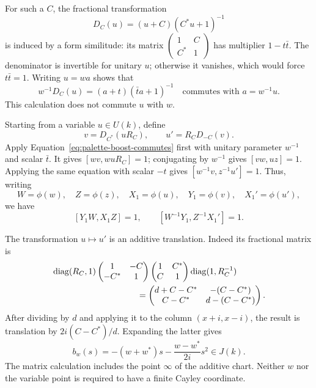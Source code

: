 For such a $C$, the fractional transformation
\[
 D_C(u)=(u+C)(C^*u+1)^{-1}
\]
is induced by a form similitude: its matrix
$\left(\begin{smallmatrix}1&C\\C^*&1\end{smallmatrix}\right)$ has
multiplier $1-t\bar t$. The denominator is invertible for unitary $u$;
otherwise it vanishes, which would force $t\bar t=1$.
Writing $u=wa$ shows that
\begin{equation}\label{eq:palette-boost-commutes}
 w^{-1}D_C(u)=(a+t)(\bar t a+1)^{-1}
 \quad\text{commutes with }a=w^{-1}u.
\end{equation}
This calculation does not commute $u$ with $w$.

Starting from a variable $u\in U(k)$, define
\[
 v=D_{C^*}(uR_C),\qquad u'=R_C D_{-C}(v).
\]
Apply Equation~\ref{eq:palette-boost-commutes} first with unitary
parameter $w^{-1}$ and scalar $\bar t$. It gives
$[wv,wuR_C]=1$; conjugating by $w^{-1}$ gives $[vw,uz]=1$.
Applying the same equation with scalar $-t$ gives
$[w^{-1}v,z^{-1}u']=1$. Thus, writing
\[
 W=\phi(w),\quad Z=\phi(z),\quad
 X_1=\phi(u),\quad Y_1=\phi(v),\quad X_1'=\phi(u'),
\]
we have
\begin{equation}\label{eq:palette-two-commutators}
 [Y_1W,X_1Z]=1,\qquad [W^{-1}Y_1,Z^{-1}X_1']=1.
\end{equation}

The transformation $u\mapsto u'$ is an additive translation. Indeed its
fractional matrix is
\begin{align*}
 &\diag(R_C,1)
 \begin{pmatrix}1&-C\\-C^*&1\end{pmatrix}
 \begin{pmatrix}1&C^*\\C&1\end{pmatrix}
 \diag(1,R_C^{-1})\\
 &\hspace{35mm}=
 \begin{pmatrix}d+C-C^*&-(C-C^*)\\ C-C^*&d-(C-C^*)\end{pmatrix}.
\end{align*}
After dividing by $d$ and applying it to the column $(x+i,x-i)$,
the result is translation by $2i(C-C^*)/d$. Expanding the latter gives
\begin{equation}\label{eq:palette-quadratic-translation}
 b_w(s)=-(w+w^*)s-\frac{w-w^*}{2i}s^2\in J(k).
\end{equation}
The matrix calculation includes the point $\infty$ of the additive
chart. Neither $w$ nor the variable point is required to have a finite
Cayley coordinate.

